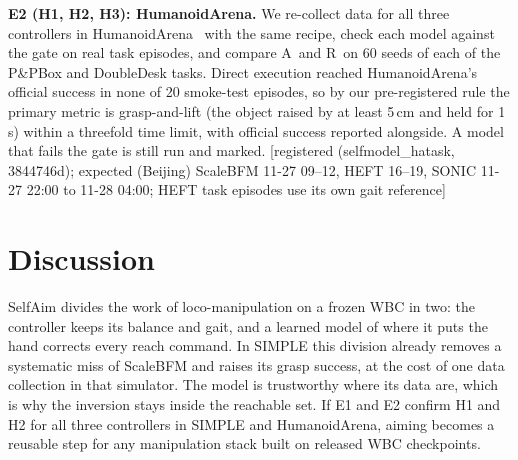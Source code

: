 \documentclass[conference]{IEEEtran}
\newif\ifdraft \drafttrue
\newcommand{\dnote}[1]{\ifdraft{\color{red}\footnotesize[#1]}\fi}
\newcommand{\Ad}{\textsc{A}}       %
\newcommand{\Rr}{\textsc{R}}       %
\begin{document}
\textbf{E2 (H1, H2, H3): HumanoidArena.} We re-collect data for all three controllers in HumanoidArena~\cite{humanoidarena} with the same recipe, check each model against the gate on real task episodes, and compare \Ad\ and \Rr\ on 60 seeds of each of the P\&PBox and DoubleDesk tasks. Direct execution reached HumanoidArena's official success in none of 20 smoke-test episodes, so by our pre-registered rule the primary metric is grasp-and-lift (the object raised by at least 5\,cm and held for 1\,s) within a threefold time limit, with official success reported alongside. A model that fails the gate is still run and marked.
\dnote{registered (selfmodel\_hatask, 3844746d); expected (Beijing) ScaleBFM 11-27 09--12, HEFT 16--19, SONIC 11-27 22:00 to 11-28 04:00; HEFT task episodes use its own gait reference}

\section{Discussion}
SelfAim divides the work of loco-manipulation on a frozen WBC in two: the controller keeps its balance and gait, and a learned model of where it puts the hand corrects every reach command. In SIMPLE this division already removes a systematic miss of ScaleBFM and raises its grasp success, at the cost of one data collection in that simulator. The model is trustworthy where its data are, which is why the inversion stays inside the reachable set. If E1 and E2 confirm H1 and H2 for all three controllers in SIMPLE and HumanoidArena, aiming becomes a reusable step for any manipulation stack built on released WBC checkpoints.
\end{document}

